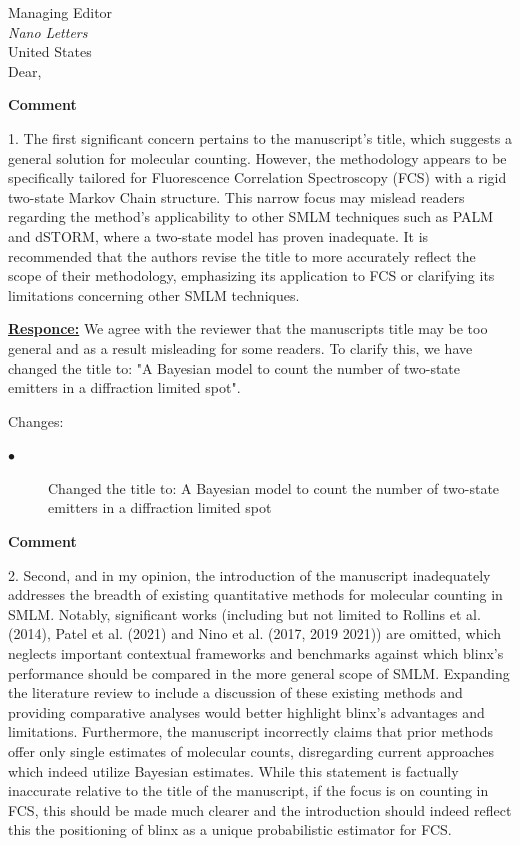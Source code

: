 \documentclass{article}
\date{\today}
\begin{document}
\thispagestyle{empty}
Managing Editor\\
\textit{Nano Letters}\\
United States\\

\vspace{5mm}
Dear,

\textbf{Comment}

1.	The first significant concern pertains to the manuscript's title, 
which suggests a general solution for molecular counting. 
However, the methodology appears to be specifically tailored for Fluorescence Correlation Spectroscopy 
(FCS) with a rigid two-state Markov Chain structure. 
This narrow focus may mislead readers regarding the method's applicability to other SMLM 
techniques such as PALM and dSTORM, where a two-state model has proven inadequate. 
It is recommended that the authors revise the title to more accurately reflect the scope of 
their methodology, emphasizing its application to FCS or clarifying its limitations concerning other SMLM techniques.

\underline{\textbf{Responce:}}
We agree with the reviewer that the manuscripts title may be too general and as a result misleading for some readers.
To clarify this, we have changed the title to: "A Bayesian model to count the number of two-state emitters in a 
diffraction limited spot". 

Changes:
\begin{description}
    \item[$\bullet$] Changed the title to: A Bayesian model to count the number of two-state emitters in a diffraction limited spot
\end{description}

\textbf{Comment}

2. Second, and in my opinion, the introduction of the manuscript inadequately addresses the 
breadth of existing quantitative methods for molecular counting in SMLM. Notably, significant works 
(including but not limited to Rollins et al. (2014), Patel et al. (2021) and Nino et al. (2017, 2019 2021)) 
are omitted, which neglects important contextual frameworks and benchmarks against which 
blinx's performance should be compared in the more general scope of SMLM. 
Expanding the literature review to include a discussion of these existing methods and providing 
comparative analyses would better highlight blinx's advantages and limitations. 
Furthermore, the manuscript incorrectly claims that prior methods offer only single estimates of 
molecular counts, disregarding current approaches which indeed utilize Bayesian estimates. 
While this statement is factually inaccurate relative to the title of the manuscript, if the 
focus is on counting in FCS, this should be made much clearer and the introduction should indeed 
reflect this the positioning of blinx as a unique probabilistic estimator for FCS.
\end{document}
